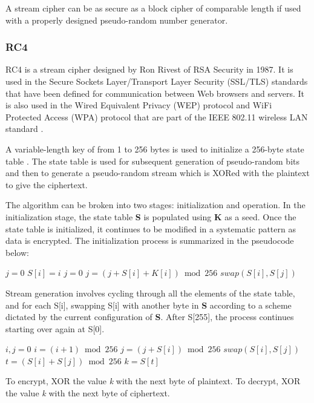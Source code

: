 \documentclass{article}
\begin{document}
A stream cipher can be as secure as a block cipher of comparable length if used with a properly designed pseudo-random number generator.

\subsubsection{RC4}
RC4 is a stream cipher designed by Ron Rivest of RSA Security in 1987. It is used in the Secure Sockets Layer/Transport Layer Security (SSL/TLS) standards that have been defined for communication between Web browsers and servers. It is also used in the Wired Equivalent Privacy (WEP) protocol and WiFi Protected Access (WPA) protocol that are part of the IEEE 802.11 wireless LAN standard \cite{stallings2011}.

A variable-length key of from 1 to 256 bytes is used to initialize a 256-byte state table \cite{mousa2006}. The state table is used for subsequent generation of pseudo-random bits and then to generate a pseudo-random stream which is XORed with the plaintext to give the ciphertext.

The algorithm can be broken into two stages: initialization and operation. In the initialization stage, the state table \textbf{S} is populated using \textbf{K} as a seed. Once the state table is initialized, it continues to be modified in a systematic pattern as data is encrypted. The initialization process is summarized in the pseudocode below:

\begin{algorithmic}
\State $j = 0$
	\State $S[i] = i$
\EndFor
\State $j = 0$
	\State $j = (j + S[i] + K[i]) \bmod 256$
	\State $swap(S[i], S[j])$
\EndFor
\end{algorithmic}

Stream generation involves cycling through all the elements of the state table, and for each S[i], swapping S[i] with another byte in \textbf{S} according to a scheme dictated by the current configuration of \textbf{S}. After S[255], the process continues starting over again at S[0].

\begin{algorithmic}
\State $i, j = 0$
	\State $i = (i + 1) \bmod 256$
	\State $j = (j + S[i]) \bmod 256$
	\State $swap(S[i], S[j])$
	\State $t = (S[i] + S[j]) \bmod 256$
	\State $k = S[t]$
\EndWhile
\end{algorithmic}

To encrypt, XOR the value \textit{k} with the next byte of plaintext. To decrypt, XOR the value \textit{k} with the next byte of ciphertext.
\end{document}
